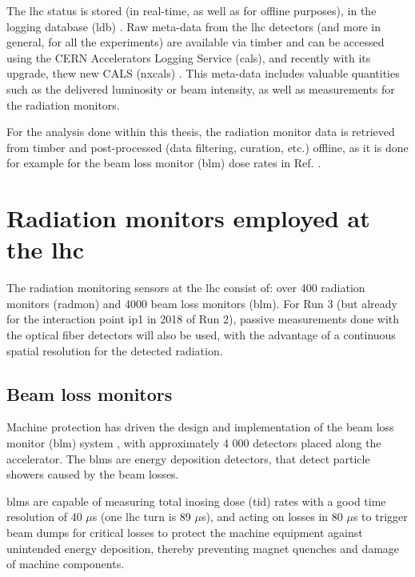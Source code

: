 \documentclass[encoding=utf8,british]{tumphthesis}
\begin{document}
The \acrshort{lhc} status is stored (in real-time, as well as for offline purposes), in the logging database (\acrshort{ldb}) \cite{LDB}. Raw meta-data from the \acrshort{lhc} detectors (and more in general, for all the experiments) are available via \acrfull{timber} \cite{TIMBER} and can be accessed using the CERN Accelerators Logging Service (\acrshort{cals}), and recently with its upgrade, thew new CALS (\acrshort{nxcals}) \cite{NXCALS}. This meta-data includes valuable quantities such as the delivered luminosity or beam intensity, as well as measurements for the radiation monitors. 


For the analysis done within this thesis, the radiation monitor data is retrieved from \acrshort{timber} and post-processed (data filtering, curation, etc.) offline, as it is done for example for the beam loss monitor (\acrshort{blm}) dose rates in Ref. \cite{Biłko:2652979}.


\section{Radiation monitors employed at the \acrshort{lhc}}
\label{chapter:LHC-radiation-monitors}
 The radiation monitoring sensors at the \acrshort{lhc} consist of: over 400 radiation monitors (\acrshort{radmon}) and 4000 beam loss monitors (\acrshort{blm}). For Run 3 (but already for the interaction point \acrshort{ip}1 in 2018 of Run 2), passive measurements done with the optical fiber detectors will also be used, with the advantage of a continuous spatial resolution for the detected radiation. 


\subsection{Beam loss monitors}

Machine protection has driven the design and implementation of the beam loss monitor (\acrshort{blm}) system \cite{BLM:description, Kalliokoski:2141806, Grishin:RUPAC2018-TUZMH03}, with approximately 4 000 detectors placed along the accelerator. The \acrshort{blm}s are energy deposition detectors, that detect particle showers caused by the beam losses.

\acrshort{blm}s are capable of measuring total inosing dose (\acrshort{tid}) rates with a good time resolution of 40 $\mu$s (one \acrshort{lhc} turn is 89 $\mu$s), and acting on losses in 80 $\mu$s to trigger beam dumps for critical losses to protect the machine equipment against unintended energy deposition, thereby preventing magnet quenches and damage of machine components. 
\end{document}
